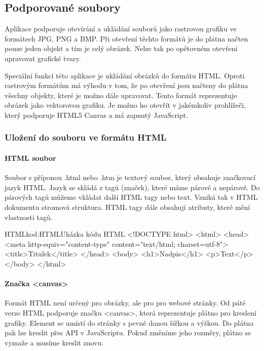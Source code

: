 \documentclass[
  field=inf,
  biblatex,
  glossaries,
  index
]{kidiplom}
\begin{document}
\subsection{Podporované soubory}

Aplikace podporuje otevírání a ukládání souborů jako rastrovou grafiku ve formátech JPG, PNG a BMP. Při otevření těchto formátů je do plátna načten pouze jeden objekt a tím je celý obrázek. Nelze tak po opětovném otevření upravovat grafické tvary. 

Speciální funkcí této aplikace je ukládání obrázků do formátu HTML. Oproti rastrovým formátům má výhodu v tom, že po otevření jsou načteny do plátna všechny objekty, které je možno dále upravovat. Tento formát reprezentuje obrázek jako vektorovou grafiku. Je možno ho otevřít v jakémkoliv prohlížeči, který podporuje HTML5 Canvas a má zapnutý JavaScript.

\subsubsection{Uložení do souboru ve formátu HTML}

\paragraph{HTML soubor}

Soubor s příponou .html nebo .htm je textový soubor, který obsahuje značkovací jazyk HTML. Jazyk se skládá z tagů (značek), které máme párové a nepárové. Do párových tagů můžeme vkládat další HTML tagy nebo text. Vzniká tak v HTML dokumentu stromová struktura. HTML tagy dále obsahují atributy, které mění vlastnosti tagů.

\begin{kicode}{HTML}{kod:HTML}{Ukázka kódu HTML}
<!DOCTYPE html>
<html>
  <head>
  <meta http-equiv="content-type" content="text/html; charset=utf-8">
  <title>Titulek</title>
  </head>
  <body>
    <h1>Nadpis</h1>
    <p>Text</p>
  </body>
</html>
\end{kicode}

\paragraph{Značka <canvas>}

Formát HTML není určený pro obrázky, ale pro pro webové stránky. Od páté verze HTML podporuje značku <canvas>, která reprezentuje plátno pro kreslení grafiky. Element se umístí do stránky s pevně danou šířkou a výškou. Do plátna pak lze kreslit přes API v JavaScriptu. Pokud změníme jeho rozměry, plátno se vymaže a musíme kreslit znovu.
\end{document}

